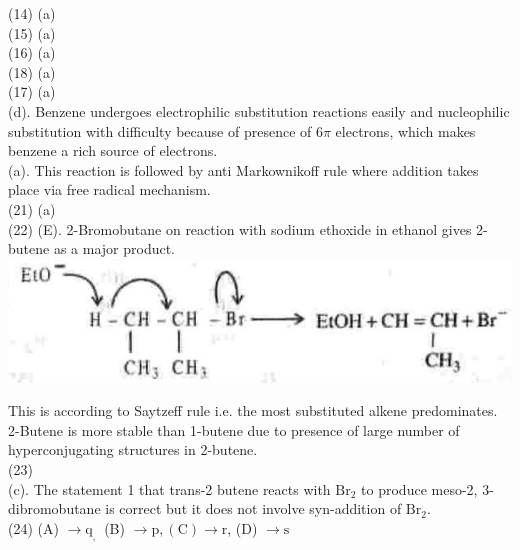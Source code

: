 \documentclass[10pt]{article}
\begin{document}
(14) (a)\\
(15) (a)\\
(16) (a)\\
(18) (a)\\
(17) (a)\\
(d). Benzene undergoes electrophilic substitution reactions easily and nucleophilic substitution with difficulty because of presence of $6 \pi$ electrons, which makes benzene a rich source of electrons.\\
(a). This reaction is followed by anti Markownikoff rule where addition takes place via free radical mechanism.\\
(21) (a)\\
(22) (E). 2-Bromobutane on reaction with sodium ethoxide in ethanol gives 2-butene as a major product.\\
\includegraphics[max width=\textwidth, center]{2025_01_28_8470952b98110cec3aabg-245(5)}

This is according to Saytzeff rule i.e. the most substituted alkene predominates. 2-Butene is more stable than 1-butene due to presence of large number of hyperconjugating structures in 2-butene.\\
(23)\\
(c). The statement 1 that trans-2 butene reacts with $\mathrm{Br}_{2}$ to produce meso-2, 3-dibromobutane is correct but it does not involve syn-addition of $\mathrm{Br}_{2}$.\\
(24) (A) $\rightarrow \mathrm{q}_{\text {, }}$ (B) $\rightarrow \mathrm{p},(\mathrm{C}) \rightarrow \mathrm{r}$, (D) $\rightarrow \mathrm{s}$
\end{document}
